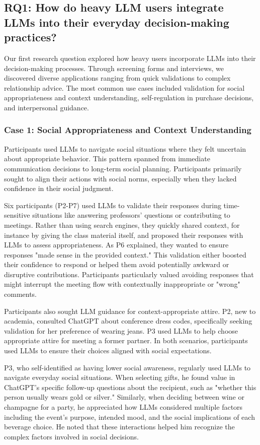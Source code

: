\subsection{RQ1: How do heavy LLM users integrate LLMs into their everyday decision-making practices?}
Our first research question explored how heavy users incorporate LLMs into their decision-making processes. Through screening forms and interviews, we discovered diverse applications ranging from quick validations to complex relationship advice. The most common use cases included validation for social appropriateness and context understanding, self-regulation in purchase decisions, and interpersonal guidance.

\subsubsection{Case 1: Social Appropriateness and Context Understanding}
Participants used LLMs to navigate social situations where they felt uncertain about appropriate behavior. This pattern spanned from immediate communication decisions to long-term social planning. Participants primarily sought to align their actions with social norms, especially when they lacked confidence in their social judgment.

Six participants (P2-P7) used LLMs to validate their responses during time-sensitive situations like answering professors' questions or contributing to meetings. Rather than using search engines, they quickly shared context, for instance by giving the class material itself, and proposed their responses with LLMs to assess appropriateness. As P6 explained, they wanted to ensure responses "made sense in the provided context." This validation either boosted their confidence to respond or helped them avoid potentially awkward or disruptive contributions. Participants particularly valued avoiding responses that might interrupt the meeting flow with contextually inappropriate or "wrong" comments.

Participants also sought LLM guidance for context-appropriate attire. P2, new to academia, consulted ChatGPT about conference dress codes, specifically seeking validation for her preference of wearing jeans. P3 used LLMs to help choose appropriate attire for meeting a former partner. In both scenarios, participants used LLMs to ensure their choices aligned with social expectations.

P3, who self-identified as having lower social awareness, regularly used LLMs to navigate everyday social situations. When selecting gifts, he found value in ChatGPT's specific follow-up questions about the recipient, such as "whether this person usually wears gold or silver." Similarly, when deciding between wine or champagne for a party, he appreciated how LLMs considered multiple factors including the event's purpose, intended mood, and the social implications of each beverage choice. He noted that these interactions helped him recognize the complex factors involved in social decisions.

